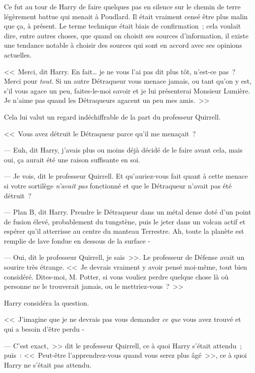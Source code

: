 Ce fut au tour de Harry de faire quelques pas en silence sur le chemin de terre légèrement battue qui menait à Poudlard. Il était vraiment censé être plus malin que ça, à présent. Le terme technique était biais de confirmation~; cela voulait dire, entre autres choses, que quand on choisit ses sources d'information, il existe une tendance notable à choisir des sources qui sont en accord avec ses opinions actuelles.

<<~Merci, dit Harry. En fait… je ne vous l'ai pas dit plus tôt, n'est-ce pas~? Merci pour \emph{tout}. Si un autre Détraqueur vous menace jamais, ou tant qu'on y est, s'il vous agace un peu, faites-le-moi savoir et je lui présenterai Monsieur Lumière. Je n'aime pas quand les Détraqueurs agacent un peu mes amis.~>>

Cela lui valut un regard indéchiffrable de la part du professeur Quirrell.

<<~Vous avez détruit le Détraqueur parce qu'il me menaçait~?

--- Euh, dit Harry, j'avais plus ou moins déjà décidé de le faire avant cela, mais oui, ça aurait été une raison suffisante en soi.

--- Je vois, dit le professeur Quirrell. Et qu'auriez-vous fait quant à cette menace si votre sortilège \emph{n'avait} \emph{pas} fonctionné et que le Détraqueur n'avait pas été détruit~?

--- Plan B, dit Harry. Prendre le Détraqueur dans un métal dense doté d'un point de fusion élevé, probablement du tungstène, puis le jeter dans un volcan actif et espérer qu'il atterrisse au centre du manteau Terrestre. Ah, toute la planète est remplie de lave fondue en dessous de la surface -

--- Oui, dit le professeur Quirrell, je sais~>>. Le professeur de Défense avait un sourire très étrange. <<~Je devrais vraiment y avoir pensé moi-même, tout bien considéré. Dites-moi, M. Potter, si vous vouliez perdre quelque chose là où personne ne le trouverait jamais, ou le mettriez-vous~?~>>

Harry considéra la question.

<<~J'imagine que je ne devrais pas vous demander \emph{ce que} vous avez trouvé et qui a besoin d'être perdu -

--- C'est exact,~>> dit le professeur Quirrell, ce à quoi Harry s'était attendu~; puis~: <<~Peut-être l'apprendrez-vous quand vous serez plus âgé~>>, ce à quoi Harry ne s'était pas attendu.

